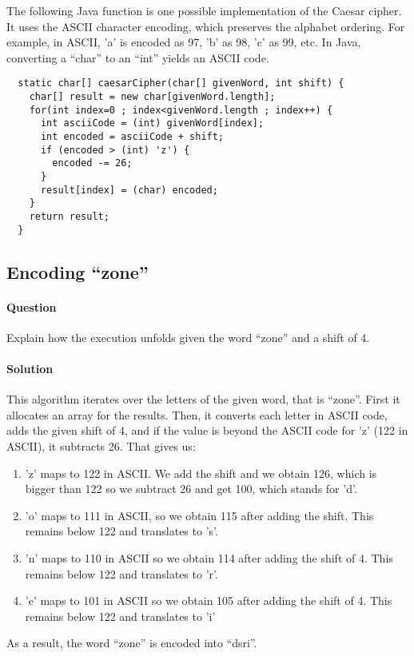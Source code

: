 \documentclass{article}
\begin{document}
The following Java function is one possible implementation of the
Caesar cipher. It uses the ASCII character encoding, which preserves
the alphabet ordering. For example, in ASCII, 'a' is encoded as 97,
'b' as 98, 'c' as 99, etc. In Java, converting a ``char'' to an
``int'' yields an ASCII code.

\begin{verbatim}
  static char[] caesarCipher(char[] givenWord, int shift) {
    char[] result = new char[givenWord.length];
    for(int index=0 ; index<givenWord.length ; index++) {
      int asciiCode = (int) givenWord[index];
      int encoded = asciiCode + shift;
      if (encoded > (int) 'z') {
        encoded -= 26;
      }
      result[index] = (char) encoded;
    }
    return result;
  }
\end{verbatim}


\subsection{Encoding ``zone''}

\paragraph{Question} Explain how the execution unfolds given the
word ``zone'' and a shift of 4. 

\paragraph{Solution} This algorithm iterates over the letters of the
given word, that is ``zone''. First it allocates an array for the
results. Then, it converts each letter in ASCII code, adds the given
shift of 4, and if the value is beyond the ASCII code for 'z' (122 in
ASCII), it subtracts 26. That gives us:
\begin{enumerate}
\item 'z' maps to 122 in ASCII. We add the shift and we obtain 126,
  which is bigger than 122 so we subtract 26 and get 100, which stands
  for 'd'.
\item 'o' maps to 111 in ASCII, so we obtain 115 after adding the
  shift. This remains below 122 and translates to 's'.
\item 'n' maps to 110 in ASCII so we obtain 114 after adding the shift
  of 4. This remains below 122 and translates to 'r'.
\item 'e' maps to 101 in ASCII so we obtain 105 after adding the shift
  of 4. This remains below 122 and translates to 'i'
\end{enumerate}
As a result, the word ``zone'' is encoded into ``dsri''.
\end{document}
